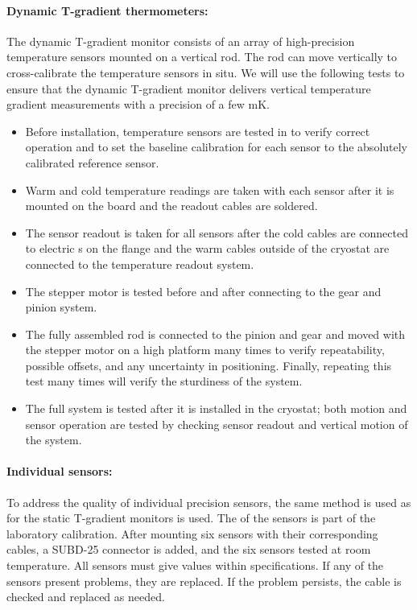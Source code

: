 \paragraph{Dynamic T-gradient thermometers:}
\label{sec:fdgen-slow-cryo-qc-thdy}

The dynamic T-gradient monitor consists of an array of high-precision temperature sensors mounted on a vertical rod. The rod can move vertically to cross-calibrate the temperature sensors in situ. %
We will use the following %
tests to ensure that the dynamic T-gradient monitor delivers vertical temperature gradient measurements with a precision of a few \si{mK}.

\begin{itemize}
\item
Before installation, temperature sensors are tested in  
to verify correct operation and to set the baseline calibration for each sensor to the absolutely calibrated reference sensor. 
\item
Warm and cold temperature readings are taken with each sensor after it is mounted on the  board and the readout cables are soldered. %
\item
The sensor readout is taken for all sensors after the cold cables are connected to electric \fdth{}s on the flange and the warm cables outside of the cryostat are connected to the temperature readout system.
\item 
The stepper motor is tested before and after connecting to the gear and pinion system.
\item
The fully assembled rod is connected to the pinion and gear and moved with the stepper motor on a high platform many times to verify repeatability, possible offsets, and any uncertainty in positioning. Finally, repeating this test many times will verify the sturdiness of the system.
\item
The full system is tested after it is installed in the cryostat; both motion and sensor operation are tested by checking %
sensor readout and vertical motion of the system.
\end{itemize} 

\paragraph{Individual sensors:}
\label{sec:fdgen-slow-cryo-qc-is}

To address the quality of individual precision sensors, the same method is used as for the static T-gradient monitors %
is used.
The  of the sensors is part of the laboratory calibration. After mounting six sensors with their corresponding cables, a
SUBD-25 connector %
is added, and the six sensors tested at room temperature. All sensors %
must %
give values within specifications.  
If any of the sensors present problems, they are replaced.  If the problem persists, the cable is checked and replaced as needed.

